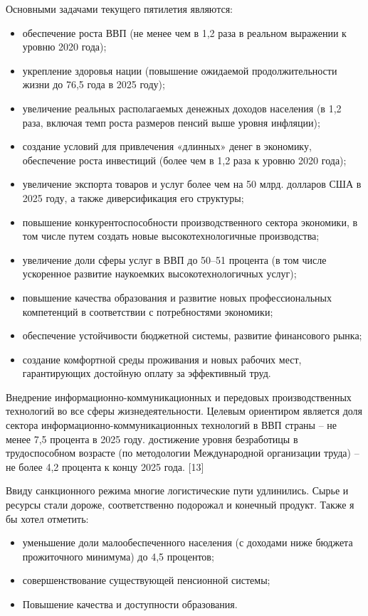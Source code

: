\documentclass[14pt,a4paper]{article}
\begin{document}
    Основными задачами текущего пятилетия являются:
    \begin{itemize}
        \item обеспечение роста ВВП (не менее чем в 1,2 раза в реальном выражении к уровню 2020 года);
        \item укрепление здоровья нации (повышение ожидаемой продолжительности жизни до 76,5 года в 2025 году);
        \item увеличение реальных располагаемых денежных доходов населения (в 1,2 раза, включая темп роста размеров пенсий выше уровня инфляции);
        \item создание условий для привлечения «длинных» денег в экономику, обеспечение роста инвестиций (более чем в 1,2 раза к уровню 2020 года);
        \item увеличение экспорта товаров и услуг более чем на 50 млрд. долларов США в 2025 году, а также диверсификация его структуры;
        \item повышение конкурентоспособности производственного сектора экономики, в том числе путем создать новые высокотехнологичные производства;
        \item увеличение доли сферы услуг в ВВП до 50–51 процента (в том числе ускоренное развитие наукоемких высокотехнологичных услуг);
        \item повышение качества образования и развитие новых профессиональных компетенций в соответствии с потребностями экономики;
        \item обеспечение устойчивости бюджетной системы, развитие финансового рынка;
        \item создание комфортной среды проживания и новых рабочих мест, гарантирующих достойную оплату за эффективный труд.
    \end{itemize}
    Внедрение информационно-коммуникационных и передовых производственных технологий во все сферы жизнедеятельности. Целевым ориентиром является доля сектора информационно-коммуникационных технологий в ВВП страны – не менее 7,5 процента в 2025 году.
    достижение уровня безработицы в трудоспособном возрасте (по методологии Международной организации труда) – не более 4,2 процента к концу 2025 года. [13]
    \par
    Ввиду санкционного режима многие логистические пути удлинились.
    Сырье и ресурсы стали дороже, соответственно подорожал и конечный продукт.
    Также я бы хотел отметить:
    \begin{itemize}
        \item уменьшение доли малообеспеченного населения (с доходами ниже бюджета прожиточного минимума) до 4,5 процентов;
        \item совершенствование существующей пенсионной системы;
        \item Повышение качества и доступности образования.
    \end{itemize}
\end{document}
